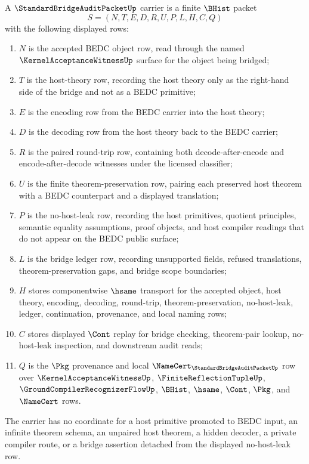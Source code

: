 \begin{definition}
\label{def:standard-bridge-audit-packet-carrier}
A $\StandardBridgeAuditPacketUp$ carrier is a finite $\BHist$ packet
$$
S=(N,T,E,D,R,U,P,L,H,C,Q)
$$
with the following displayed rows:
\begin{enumerate}
\item $N$ is the accepted BEDC object row, read through the named $\KernelAcceptanceWitnessUp$ surface for the object being bridged;
\item $T$ is the host-theory row, recording the host theory only as the right-hand side of the bridge and not as a BEDC primitive;
\item $E$ is the encoding row from the BEDC carrier into the host theory;
\item $D$ is the decoding row from the host theory back to the BEDC carrier;
\item $R$ is the paired round-trip row, containing both decode-after-encode and encode-after-decode witnesses under the licensed classifier;
\item $U$ is the finite theorem-preservation row, pairing each preserved host theorem with a BEDC counterpart and a displayed translation;
\item $P$ is the no-host-leak row, recording the host primitives, quotient principles, semantic equality assumptions, proof objects, and host compiler readings that do not appear on the BEDC public surface;
\item $L$ is the bridge ledger row, recording unsupported fields, refused translations, theorem-preservation gaps, and bridge scope boundaries;
\item $H$ stores componentwise $\hsame$ transport for the accepted object, host theory, encoding, decoding, round-trip, theorem-preservation, no-host-leak, ledger, continuation, provenance, and local naming rows;
\item $C$ stores displayed $\Cont$ replay for bridge checking, theorem-pair lookup, no-host-leak inspection, and downstream audit reads;
\item $Q$ is the $\Pkg$ provenance and local $\NameCert_{\StandardBridgeAuditPacketUp}$ row over $\KernelAcceptanceWitnessUp$, $\FiniteReflectionTupleUp$, $\GroundCompilerRecognizerFlowUp$, $\BHist$, $\hsame$, $\Cont$, $\Pkg$, and $\NameCert$ rows.
\end{enumerate}
The carrier has no coordinate for a host primitive promoted to BEDC input, an infinite theorem schema, an unpaired host theorem, a hidden decoder, a private compiler route, or a bridge assertion detached from the displayed no-host-leak row.
\end{definition}

